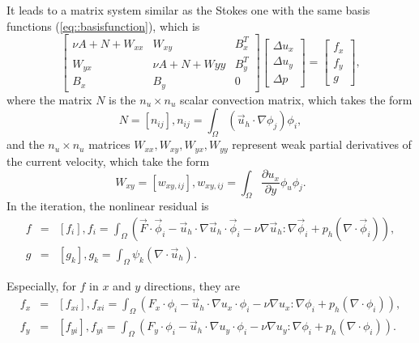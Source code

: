 \documentclass[a4paper]{article}
\begin{document}
It leads to a matrix system similar as the Stokes one with the same
basis functions (\ref{eq::basisfunction}), which is
\begin{equation}
\left[ \begin{array}{ccc}
\nu A + N + W_{xx} & W_{xy} & B_x^T \\
W_{yx} & \nu A + N + W{yy} & B_y^T \\
B_x & B_y & 0
\end{array}
\right]
\left[\begin{array}{ccc}
\Delta u_x\\
\Delta u_y\\
\Delta p
\end{array}
\right] =
\left[\begin{array}{ccc}
f_x\\
f_y\\
g
\end{array}
\right],
\label{Navier-Stokes}
\end{equation}
where the matrix $N$ is the $n_u \times n_u$ scalar convection matrix, which takes the form 
\begin{equation}
N = [n_{ij}], n_{ij} = \int_{\Omega} (\vec{u}_h\cdot \nabla\phi_j)\phi_i,
\label{mt::N}
\end{equation}
and the $n_u\times n_u$ matrices $W_{xx}, W_{xy}, W_{yx}, W_{yy}$
represent weak partial derivatives of the current velocity, which take the form
\begin{equation}
W_{xy} = [w_{xy,ij}], w_{xy,ij} = \int_{\Omega} \frac{\partial u_x}{\partial y}\phi_u \phi_j.
\label{mt::W}
\end{equation}
In the iteration, the nonlinear residual is
\begin{equation}
\begin{array}{rcl}
f &=& [f_i], f_i = \int_{\Omega}(\vec{F} \cdot \vec{\phi}_i -
\vec{u}_h \cdot \nabla \vec{u}_h \cdot \vec{\phi}_i - \nu \nabla
\vec{u}_h : \nabla \vec{\phi}_i + p_h(\nabla \cdot \vec{\phi}_i)), \\ g
& = & [g_k], g_k = \int_{\Omega} \psi_k(\nabla \cdot \vec{u}_h).
\end{array}
\end{equation}

Especially, for $f$ in $x$ and $y$ directions, they are
\begin{equation}
\begin{array}{rcl}
f_x & = & [f_{xi}], f_{xi} = \int_{\Omega}(F_x \cdot \phi_i -
\vec{u}_h \cdot \nabla u_x \cdot \phi_i - \nu \nabla u_x : \nabla
\phi_i + p_h(\nabla \cdot \phi_i)), \\ f_y & = & [f_{yi}], f_{yi} =
\int_{\Omega}(F_y \cdot \phi_i - \vec{u}_h \cdot \nabla u_y \cdot
\phi_i - \nu \nabla u_y : \nabla \phi_i + p_h(\nabla \cdot \phi_i)).
\label{mt::f}
\end{array}
\end{equation}
\end{document}
